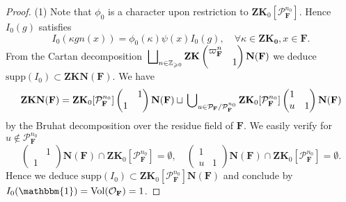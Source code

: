 \documentclass[A4]{amsart}
\def\geq{\geqslant}
\numberwithin{equation}{section} \everymath{\displaystyle}
\newcommand{\gp}[1]{\mathbf{#1}}
\newcommand{\Z}{\mathbb{Z}}
\newcommand{\id}{\mathbbm{1}}
\newcommand{\F}{\mathbf{F}}
\newcommand{\vO}{\mathcal{O}}
\newcommand{\vP}{\mathcal{P}}
\newcommand{\Vol}{{\rm Vol}}
\begin{document}
\begin{proof}
	(1) Note that $\phi_0$ is a character upon restriction to $\gp{Z}\gp{K}_0[\vP_{\F}^{n_0}]$. Hence $I_0(g)$ satisfies
	$$ I_0(\kappa g n(x)) = \phi_0(\kappa) \psi(x) I_0(g), \quad \forall \kappa \in \gp{Z}\gp{K_0}, x \in \F. $$
	From the Cartan decomposition $\sideset{}{_{n \in \Z_{\geq 0}}} \bigsqcup \gp{Z} \gp{K} \begin{pmatrix} \varpi_{\F}^n & \\ & 1 \end{pmatrix} \gp{N}(\F)$ we deduce $\mathrm{supp}(I_0) \subset \gp{Z} \gp{K} \gp{N}(\F)$. We have
	$$ \gp{Z} \gp{K} \gp{N}(\F) = \gp{Z}\gp{K}_0[\vP_{\F}^{n_0}] \begin{pmatrix} & 1 \\ 1 & \end{pmatrix} \gp{N}(\F) \sqcup \sideset{}{_{u \in \vP_{\F}/\vP_{\F}^{n_0}}} \bigcup \gp{Z}\gp{K}_0[\vP_{\F}^{n_0}] \begin{pmatrix} 1 & \\ u & 1 \end{pmatrix} \gp{N}(\F) $$
	by the Bruhat decomposition over the residue field of $\F$. We easily verify for $u \notin \vP_{\F}^{n_0}$
	$$ \begin{pmatrix} & 1 \\ 1 & \end{pmatrix} \gp{N}(\F) \cap \gp{Z}\gp{K}_0[\vP_{\F}^{n_0}] = \emptyset, \quad \begin{pmatrix} 1 & \\ u & 1 \end{pmatrix} \gp{N}(\F) \cap \gp{Z}\gp{K}_0[\vP_{\F}^{n_0}] = \emptyset. $$
	Hence we deduce $\mathrm{supp}(I_0) \subset \gp{Z} \gp{K}_0[\vP_{\F}^{n_0}] \gp{N}(\F)$ and conclude by $I_0(\id) = \Vol(\vO_{\F}) = 1$.
	

\end{proof}
\end{document}
